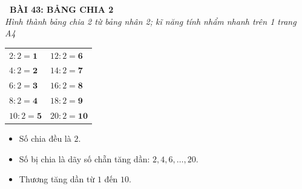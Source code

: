 \documentclass[11pt,a4paper]{article}
\begin{document}
\begin{tcolorbox}[
  enhanced,
  colback=violet!8!white,
  colframe=violet!70!black,
  arc=3mm, boxrule=1.2pt,
  left=3mm, right=3mm, top=2mm, bottom=2mm,
  halign=center
]
  {\LARGE\bfseries\color{violet!90!black}\faBookmark\ BÀI 43: BẢNG CHIA 2}\\[1mm]
  {\itshape\footnotesize\color{black!75} Hình thành bảng chia 2 từ bảng nhân 2; kĩ năng tính nhẩm nhanh trên 1 trang A4}
\end{tcolorbox}

\vspace{-2mm}

\noindent
\begin{minipage}[t]{0.49\textwidth}\vspace{0pt}
\begin{tcolorbox}[
  enhanced,
  colback=violet!4!white,
  colframe=violet!75!black,
  arc=2mm, boxrule=0.8pt,
  left=2mm, right=2mm, top=1.8mm, bottom=1.8mm,
  title={\footnotesize\bfseries\color{white}\faKey\ 1. Bảng chia 2 chuẩn mực}
]
{\footnotesize
\begin{tabular}{l@{\quad}l}
  $2 : 2 = \mathbf{1}$ & $12 : 2 = \mathbf{6}$ \\
  $4 : 2 = \mathbf{2}$ & $14 : 2 = \mathbf{7}$ \\
  $6 : 2 = \mathbf{3}$ & $16 : 2 = \mathbf{8}$ \\
  $8 : 2 = \mathbf{4}$ & $18 : 2 = \mathbf{9}$ \\
  $10 : 2 = \mathbf{5}$ & $20 : 2 = \mathbf{10}$
\end{tabular}
\vspace{1mm}
\begin{itemize}\setlength{\itemsep}{0.5pt}\setlength{\leftskip}{-2.5mm}
  \item Số chia đều là $2$.
  \item Số bị chia là dãy số chẵn tăng dần: $2, 4, 6, \dots, 20$.
  \item Thương tăng dần từ $1$ đến $10$.
\end{itemize}
}
\end{tcolorbox}
\end{minipage}
\hfill
\end{document}
